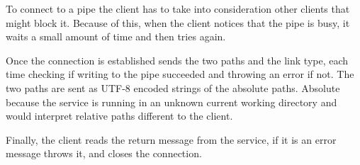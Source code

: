To connect to a pipe the client has to take into consideration other clients
that might block it. Because of this, when the client notices that the pipe is
busy, it waits a small amount of time and then tries again.

Once the connection is established sends the two paths and the link type, each
time checking if writing to the pipe succeeded and throwing an error if not.
The two paths are sent as UTF-8 encoded strings of the absolute paths. Absolute
because the service is running in an unknown current working directory and
would interpret relative paths different to the client.

Finally, the client reads the return message from the service, if it is an
error message throws it, and closes the connection.
